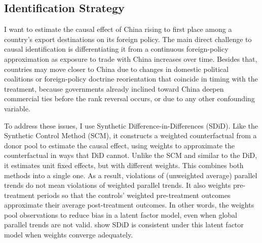 \documentclass[referee,pdflatex,sn-basic]{sn-jnl}
\theoremstyle{thmstylethree}
\begin{document}
\subsection{Identification Strategy}\label{identification-strategy}

I want to estimate the causal effect of China rising to first place among a country's export destinations on its foreign policy. The main direct challenge to causal identification is differentiating it from a continuous foreign-policy approximation as exposure to trade with China increases over time. Besides that, countries may move closer to China due to changes in domestic political coalitions or foreign-policy doctrine reorientation that coincide in timing with the treatment, because governments already inclined toward China deepen commercial ties before the rank reversal occurs, or due to any other confounding variable.

To address these issues, I use Synthetic Difference-in-Differences (SDiD). Like the Synthetic Control Method (SCM), it constructs a weighted counterfactual from a donor pool to estimate the causal effect, using weights to approximate the counterfactual in ways that DiD cannot. Unlike the SCM and similar to the DiD, it estimates unit fixed effects, but with different weights. This combines both methods into a single one. As a result, violations of (unweighted average) parallel trends do not mean violations of weighted parallel trends. It also weights pre-treatment periods so that the controls' weighted pre-treatment outcomes approximate their average post-treatment outcomes. In other words, the weights pool observations to reduce bias in a latent factor model, even when global parallel trends are not valid. \citet{arkhangelsky_etal2021} show SDiD is consistent under this latent factor model when weights converge adequately.
\end{document}
